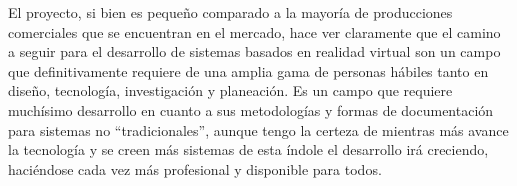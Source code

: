 El proyecto, si bien es pequeño comparado a la mayoría de producciones comerciales que se encuentran en el mercado, hace ver claramente que el camino a seguir para el desarrollo de sistemas basados en realidad virtual son un campo que definitivamente requiere de una amplia gama de personas hábiles tanto en diseño, tecnología, investigación y planeación. Es un campo que requiere muchísimo desarrollo en cuanto a sus metodologías y formas de documentación para sistemas no “tradicionales”, aunque tengo la certeza de mientras más avance la tecnología y se creen más sistemas de esta índole el desarrollo irá creciendo, haciéndose cada vez más profesional y disponible para todos.\\
